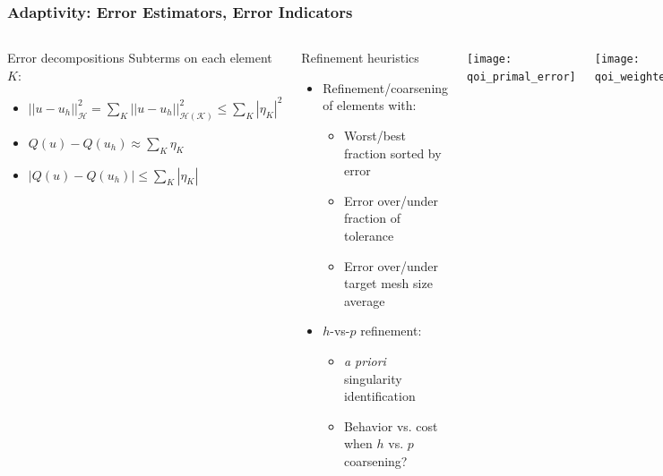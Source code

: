 \documentclass[mathserif]{beamer}
\newcommand{\abs}[1]{\ensuremath{ \left|#1\right|}}
\newcommand{\norm}[1]{\ensuremath{ \left|\left|#1\right|\right|}}
\newcommand{\Qoi}{{\ensuremath{Q}}}
\begin{document}
\begin{frame}
\frametitle{Adaptivity: Error Estimators, Error Indicators}
\begin{columns}
\begin{block}{Error decompositions}
	Subterms on each element $K$:
	\begin{itemize}
		\item $\norm{u-u_h}_\mathcal{H}^2 = 
			\sum_K \norm{u-u_h}_\mathcal{H(K)}^2 \leq 
			\sum_K \abs{\eta_K}^2$
		\item $\Qoi(u) - \Qoi(u_h) \approx \sum_K \eta_K$
		\item $\abs{\Qoi(u) - \Qoi(u_h)} \leq \sum_K \abs{\eta_K}$
	\end{itemize}
\end{block}
\begin{block}{Refinement heuristics}
	\begin{itemize}
	\item Refinement/coarsening of elements with:
	\begin{itemize}
		\item Worst/best fraction sorted by error
		\item Error over/under fraction of tolerance
		\item Error over/under target mesh size average
	\end{itemize}
	\item $h$-vs-$p$ refinement:
	\begin{itemize}
		\item {\textit{a priori}} singularity identification
		\item Behavior vs. cost when $h$ vs. $p$ coarsening?
	\end{itemize}
	\end{itemize}
\end{block}

\center
\texttt{[image: qoi\_primal\_error]}

\center
\texttt{[image: qoi\_weighted\_error]}
\end{columns}
\end{frame}
\end{document}
